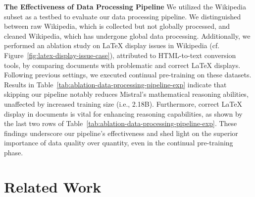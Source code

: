 \textbf{The Effectiveness of Data Processing Pipeline} \quad We utilized the Wikipedia subset as a testbed to evaluate our data processing pipeline. We distinguished between raw Wikipedia, which is collected but not globally processed, and cleaned Wikipedia, which has undergone global data processing. Additionally, we performed an ablation study on LaTeX display issues in Wikipedia (cf. Figure~\ref{fig:latex-display-issue-case}), attributed to HTML-to-text conversion tools, by comparing documents with problematic and correct LaTeX displays. Following previous settings, we executed continual pre-training on these datasets. Results in Table~\ref{tab:ablation-data-processing-pipeline-exp} indicate that skipping our pipeline notably reduces Mistral's mathematical reasoning abilities, unaffected by increased training size (i.e., 2.18B). Furthermore, correct LaTeX display in documents is vital for enhancing reasoning capabilities, as shown by the last two rows of Table~\ref{tab:ablation-data-processing-pipeline-exp}. These findings underscore our pipeline's effectiveness and shed light on the superior importance of data quality over quantity, even in the continual pre-training phase.

\section{Related Work}

